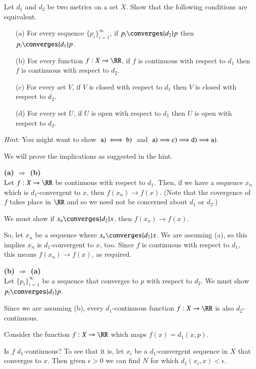 \documentclass{homework}
\begin{document}
\begin{exercise}{3}
Let $d_1$ and $d_2$ be two metrics on a set $X$.  Show that the following
conditions are equivalent.
\begin{itemize}
\item[(a)] For every sequence $\{ p_i\}_{i=1}^\infty$, if $p_i\converges{d_2} p$
then $p_i\converges{d_1} p$.
\item[(b)] For every function $f:X\rightarrow \RR$, if $f$ is continuous with
respect to $d_1$ then $f$ is continuous with respect to $d_2$.
\item[(c)] For every set $V$, if $V$ is closed with respect to $d_1$ then
$V$ is closed with respect to $d_2$.
\item[(d)] For every set $U$, if $U$ is open with respect to $d_1$ then
$U$ is open with respect to $d_2$.
\end{itemize}

{\it Hint:} You might want to show $\;{\rm a)} \iff {\rm b)}\;$ and
$\;{\rm a)} \Longrightarrow {\rm c)} \Longrightarrow {\rm d)} 
\Longrightarrow {\rm a)}$.
\end{exercise}
\solution
We will prove the implications as suggested in the hint.

\textbf{(a) $\Longrightarrow$ (b)}\\
Let $f:X\rightarrow \RR$ be continuous with respect to $d_1$.  Then, if we
have a sequence $x_n$ which is $d_1$-convergent to $x$, then $f(x_n)\rightarrow f(x)$.
(Note that the covergence of $f$ takes place in $\RR$ and so we need not
be concerned about $d_1$ or $d_2$.)

We must show if $x_n\converges{d_2} x$, then $f(x_n)\rightarrow f(x)$.

So, let $x_n$ be a sequence where $x_n\converges{d_2} x$.  We are assuming (a),
so this
implies $x_n$ is $d_1$-convergent to $x$, too.  Since $f$ is continuous with respect
to $d_1$, this means $f(x_n)\rightarrow f(x)$, as required.


\textbf{(b) $\Longrightarrow$ (a)}\\
Let $\{p_i\}_{i=1}^\infty$ be a sequence that converges to $p$ with respect
to $d_2$.  We must show $p_i\converges{d_1}p$.

Since we are assuming (b), every $d_1$-continuous function $f:X\rightarrow\RR$ is also
$d_2$-continuous.

Consider the function $f:X\rightarrow\RR$ which maps $f(x)=d_1(x,p)$.

Is $f$ $d_1$-continuous?  To see that it is, let $x_i$ be a $d_1$-convergent
sequence in $X$ that converges to $x$.  Then given $\epsilon>0$ we can find
$N$ for which $d_1(x_i,x)<\epsilon$.
\end{document}
